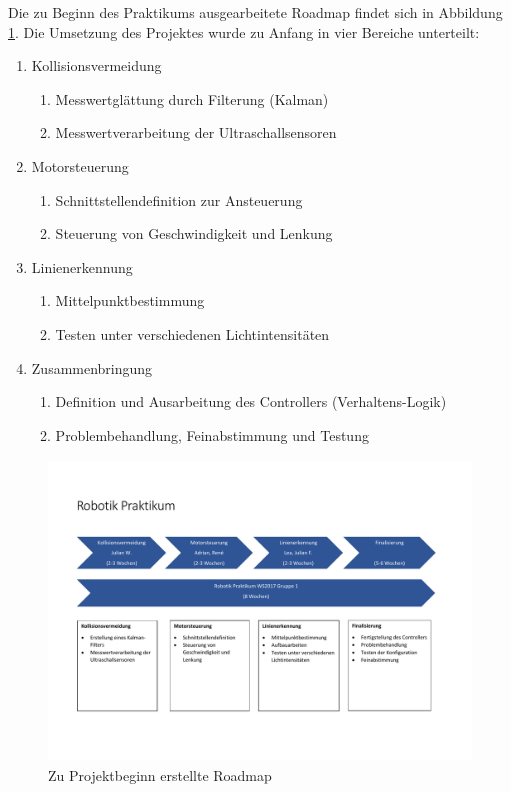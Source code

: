 \documentclass[12pt,a4paper]{report}
\begin{document}
Die zu Beginn des Praktikums ausgearbeitete Roadmap findet sich in Abbildung \ref{img_Roadmap_Gr1}.
\newpage
Die Umsetzung des Projektes wurde zu Anfang in vier Bereiche unterteilt:
\begin{enumerate}
	\item{Kollisionsvermeidung
	\begin{enumerate}
		\item Messwertglättung durch Filterung (Kalman)
		\item Messwertverarbeitung der Ultraschallsensoren
	\end{enumerate}}
	\item {Motorsteuerung
		\begin{enumerate}
		\item Schnittstellendefinition zur Ansteuerung
		\item Steuerung von Geschwindigkeit und Lenkung
		\end{enumerate}}
	\item{Linienerkennung
	\begin{enumerate}
		\item Mittelpunktbestimmung
		\item Testen unter verschiedenen Lichtintensitäten
		\end{enumerate}}
		\item{Zusammenbringung
		\begin{enumerate}
			\item Definition und Ausarbeitung des Controllers (Verhaltens-Logik)
			\item Problembehandlung, Feinabstimmung und Testung
		\end{enumerate}}
\end{enumerate}

\begin{figure}
\centering
\includegraphics[width=\textwidth, height=8cm, keepaspectratio]{Bilder/Roadmap_Gr1.pdf}
\caption{Zu Projektbeginn erstellte Roadmap}
\label{img_Roadmap_Gr1}
\end{figure}
\end{document}
